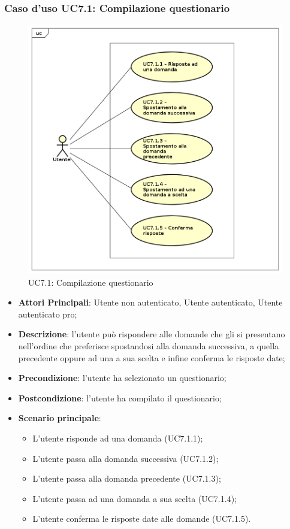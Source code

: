 \subsubsection{Caso d'uso UC7.1: Compilazione questionario}
\label{UC7.1}
\begin{figure}[h]
\centering
\includegraphics[scale=0.5,keepaspectratio]{UML/UC7_1.png}
\caption{UC7.1: Compilazione questionario}
\end{figure}
\FloatBarrier
\begin{itemize}
\item\textbf{Attori Principali}: Utente non autenticato, Utente autenticato, Utente autenticato pro;
\item\textbf{Descrizione}: l'utente può rispondere alle domande che gli si presentano nell'ordine che preferisce spostandosi alla domanda successiva, a quella precedente oppure ad una a sua scelta e infine conferma le risposte date;
\item\textbf{Precondizione}: l'utente ha selezionato un questionario;
\item\textbf{Postcondizione}: l'utente ha compilato il questionario;
\item\textbf{Scenario principale}:
\begin{itemize}
\item L'utente risponde ad una domanda (UC7.1.1);
\item L'utente passa alla domanda successiva (UC7.1.2);
\item L'utente passa alla domanda precedente (UC7.1.3);
\item L'utente passa ad una domanda a sua scelta (UC7.1.4);
\item L'utente conferma le risposte date alle domande (UC7.1.5).
\end{itemize}
\end{itemize}

